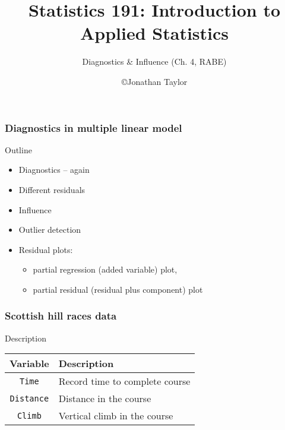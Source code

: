 \documentclass[handout]{beamer}
\title{Statistics 191: Introduction to Applied Statistics}
\subtitle{Diagnostics \& Influence  (Ch. 4, RABE)}
\author{\copyright Jonathan Taylor \\
   }
\begin{document}
   \begin{frame}
   \titlepage
   \end{frame}


   \begin{frame} \frametitle{Diagnostics in multiple linear model}

   \begin{block}
   {Outline}
   \begin{itemize}

   \item Diagnostics -- again
   \item Different residuals


   \item Influence

   \item Outlier detection

   \item Residual plots:
   \begin{itemize}
   \item partial regression (added variable) plot,

   \item partial residual (residual plus component) plot
   \end{itemize}
   \end{itemize}
   \end{block}
   \end{frame}


   \begin{frame} \frametitle{Scottish hill races data}

   \begin{block}
   {Description}

   \begin{tabular}{c|l}
   Variable & Description \\ \hline
   {\tt Time} & Record time to complete course \\
   {\tt Distance} & Distance in the course \\
   {\tt Climb} & Vertical climb in the course \\
   \end{tabular}
   \end{block}
   \end{frame}

\end{document}
